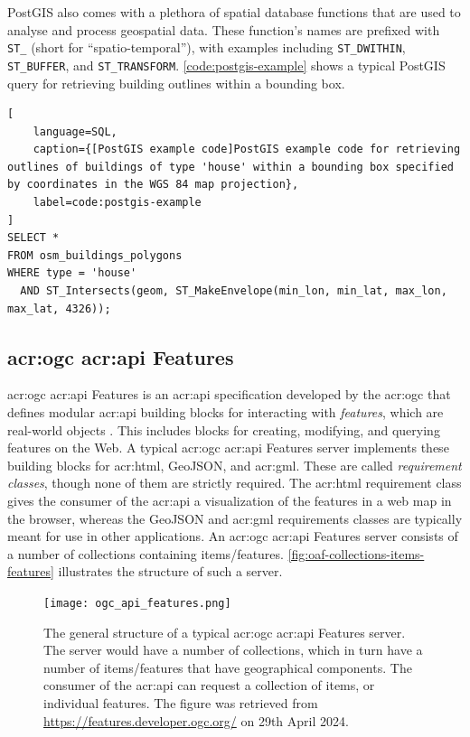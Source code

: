 PostGIS also comes with a plethora of spatial database functions that are used to analyse and process geospatial data. These function's names are prefixed with \texttt{ST\_} (short for \enquote{spatio-temporal}), with examples including \texttt{ST\_DWITHIN}, \texttt{ST\_BUFFER}, and \texttt{ST\_TRANSFORM}. \autoref{code:postgis-example} shows a typical PostGIS query for retrieving building outlines within a bounding box.

\begin{lstlisting}[
    language=SQL,
    caption={[PostGIS example code]PostGIS example code for retrieving outlines of buildings of type 'house' within a bounding box specified by coordinates in the WGS 84 map projection},
    label=code:postgis-example
]
SELECT * 
FROM osm_buildings_polygons 
WHERE type = 'house' 
  AND ST_Intersects(geom, ST_MakeEnvelope(min_lon, min_lat, max_lon, max_lat, 4326));
\end{lstlisting}

\subsection[OGC API Features]{\acrshort{acr:ogc} \acrshort{acr:api} Features}
\label{subsec:ogc-api-features}

\acrshort{acr:ogc} \acrshort{acr:api} Features is an \acrshort{acr:api} specification developed by the \acrfull{acr:ogc} that defines modular \acrshort{acr:api} building blocks for interacting with \textit{features}, which are real-world objects \citep{opengeospatialconsortiumOGCAPIFeatures2022}. This includes blocks for creating, modifying, and querying features on the Web. A typical \acrshort{acr:ogc} \acrshort{acr:api} Features server implements these building blocks for \acrshort{acr:html}, GeoJSON, and \acrshort{acr:gml}. These are called \textit{requirement classes}, though none of them are strictly required. The \acrshort{acr:html} requirement class gives the consumer of the \acrshort{acr:api} a visualization of the features in a web map in the browser, whereas the GeoJSON and \acrshort{acr:gml} requirements classes are typically meant for use in other applications. An \acrshort{acr:ogc} \acrshort{acr:api} Features server consists of a number of collections containing items/features. \autoref{fig:oaf-collections-items-features} illustrates the structure of such a server.

\begin{figure}[h]
    \centering
    \texttt{[image: ogc\_api\_features.png]}
    \caption[The general structure of a typical OGC API Features server]{The general structure of a typical \acrshort{acr:ogc} \acrshort{acr:api} Features server. The server would have a number of collections, which in turn have a number of items/features that have geographical components. The consumer of the \acrshort{acr:api} can request a collection of items, or individual features. The figure was retrieved from \url{https://features.developer.ogc.org/} on 29th April 2024.}
    \label{fig:oaf-collections-items-features}
\end{figure}

